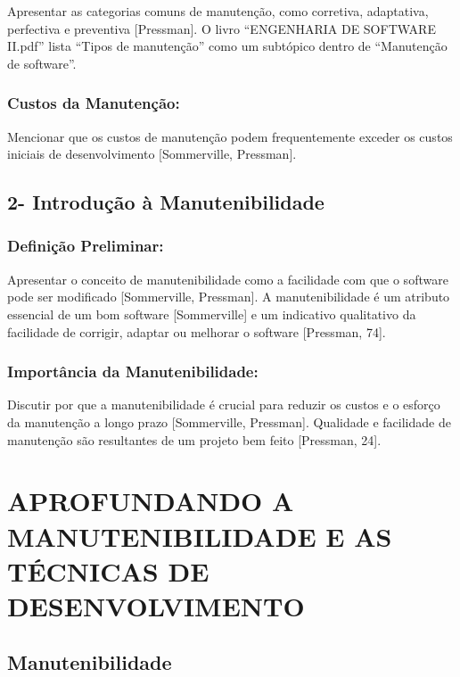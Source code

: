 \documentclass[
]{book}
\begin{document}
Apresentar as categorias comuns de manutenção, como corretiva, adaptativa, perfectiva e preventiva {[}Pressman{]}. O livro ``ENGENHARIA DE SOFTWARE II.pdf'' lista ``Tipos de manutenção'' como um subtópico dentro de ``Manutenção de software''.

\subsection{Custos da Manutenção:}\label{custos-da-manutenuxe7uxe3o}

Mencionar que os custos de manutenção podem frequentemente exceder os custos iniciais de desenvolvimento {[}Sommerville, Pressman{]}.

\section{2- Introdução à Manutenibilidade}\label{introduuxe7uxe3o-uxe0-manutenibilidade}

\subsection{Definição Preliminar:}\label{definiuxe7uxe3o-preliminar}

Apresentar o conceito de manutenibilidade como a facilidade com que o software pode ser modificado {[}Sommerville, Pressman{]}. A manutenibilidade é um atributo essencial de um bom software {[}Sommerville{]} e um indicativo qualitativo da facilidade de corrigir, adaptar ou melhorar o software {[}Pressman, 74{]}.

\subsection{Importância da Manutenibilidade:}\label{importuxe2ncia-da-manutenibilidade}

Discutir por que a manutenibilidade é crucial para reduzir os custos e o esforço da manutenção a longo prazo {[}Sommerville, Pressman{]}. Qualidade e facilidade de manutenção são resultantes de um projeto bem feito {[}Pressman, 24{]}.

\chapter{APROFUNDANDO A MANUTENIBILIDADE E AS TÉCNICAS DE DESENVOLVIMENTO}\label{aprofundando-a-manutenibilidade-e-as-tuxe9cnicas-de-desenvolvimento}

\section{Manutenibilidade}\label{manutenibilidade}
\end{document}
